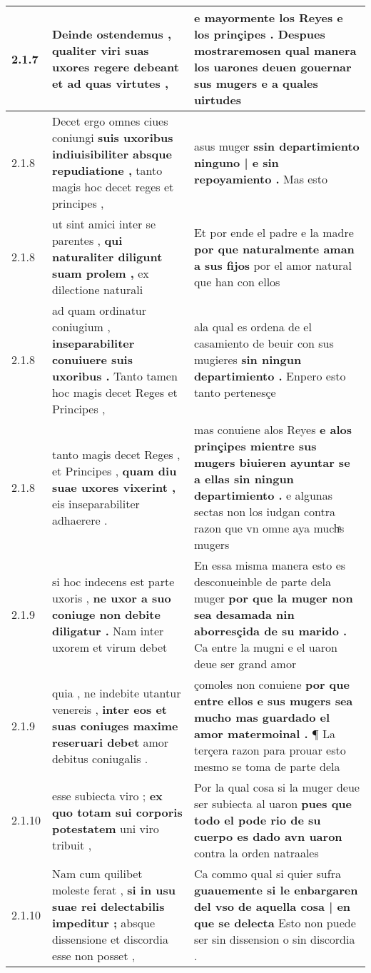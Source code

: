 \begin{tabular}{|p{1cm}|p{6.5cm}|p{6.5cm}|}
2.1.7 & Deinde ostendemus , \textbf{ qualiter viri suas uxores regere debeant } et ad quas virtutes , & e mayormente los Reyes e los prinçipes . \textbf{ Despues mostraremosen qual manera los uarones deuen gouernar sus mugers } e a quales uirtudes \\\hline
2.1.8 & Decet ergo omnes ciues coniungi \textbf{ suis uxoribus indiuisibiliter absque repudiatione , } tanto magis hoc decet reges et principes , & asus muger \textbf{ ssin departimiento ninguno | e sin repoyamiento . } Mas esto \\\hline
2.1.8 & ut sint amici inter se parentes , \textbf{ qui naturaliter diligunt suam prolem , } ex dilectione naturali & Et por ende el padre e la madre \textbf{ por que naturalmente aman a sus fijos } por el amor natural que han con ellos \\\hline
2.1.8 & ad quam ordinatur coniugium , \textbf{ inseparabiliter conuiuere suis uxoribus . } Tanto tamen hoc magis decet Reges et Principes , & ala qual es ordena de el casamiento de beuir con sus mugieres \textbf{ sin ningun departimiento . } Enpero esto tanto pertenesçe \\\hline
2.1.8 & tanto magis decet Reges , et Principes , \textbf{ quam diu suae uxores vixerint , } eis inseparabiliter adhaerere . & mas conuiene alos Reyes \textbf{ e alos prinçipes mientre sus mugers biuieren ayuntar se a ellas sin ningun departimiento . } e algunas sectas non los iudgan contra razon que vn omne aya muchͣs mugers \\\hline
2.1.9 & si hoc indecens est parte uxoris , \textbf{ ne uxor a suo coniuge non debite diligatur . } Nam inter uxorem et virum debet & En essa misma manera esto es desconueinble de parte dela muger \textbf{ por que la muger non sea desamada nin aborresçida de su marido . } Ca entre la mugni e el uaron deue ser grand amor \\\hline
2.1.9 & quia , ne indebite utantur venereis , \textbf{ inter eos et suas coniuges maxime reseruari debet } amor debitus coniugalis . & çomoles non conuiene \textbf{ por que entre ellos e sus mugers sea mucho mas guardado el amor matermoinal . } ¶ La terçera razon para prouar esto mesmo se toma de parte dela \\\hline
2.1.10 & esse subiecta viro ; \textbf{ ex quo totam sui corporis potestatem } uni viro tribuit , & Por la qual cosa si la muger deue ser subiecta al uaron \textbf{ pues que todo el pode rio de su cuerpo es dado avn uaron } contra la orden natraales \\\hline
2.1.10 & Nam cum quilibet moleste ferat , \textbf{ si in usu suae rei delectabilis impeditur ; } absque dissensione et discordia esse non posset , & Ca commo qual si quier sufra \textbf{ guauemente si le enbargaren del vso de aquella cosa | en que se delecta } Esto non puede ser sin dissension o sin discordia . \\\hline

\end{tabular}
